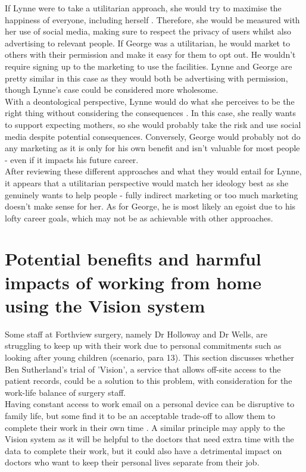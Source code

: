 \documentclass[12pt,a4paper]{article}
\begin{document}
If Lynne were to take a utilitarian approach, she would try to maximise the happiness of everyone, including herself \cite{Utilitarianism}. Therefore, she would be measured with her use of social media, making sure to respect the privacy of users whilst also advertising to relevant people. If George was a utilitarian, he would market to others with their permission and make it easy for them to opt out. He wouldn't require signing up to the marketing to use the facilities. Lynne and George are pretty similar in this case as they would both be advertising with permission, though Lynne's case could be considered more wholesome.\\

With a deontological perspective, Lynne would do what she perceives to be the right thing without considering the consequences \cite{Deontology}. In this case, she really wants to support expecting mothers, so she would probably take the risk and use social media despite potential consequences. Conversely, George would probably not do any marketing as it is only for his own benefit and isn't valuable for most people - even if it impacts his future career.\\

After reviewing these different approaches and what they would entail for Lynne, it appears that a utilitarian perspective would match her ideology best as she genuinely wants to help people - fully indirect marketing or too much marketing doesn't make sense for her. As for George, he is most likely an egoist due to his lofty career goals, which may not be as achievable with other approaches.

\section{Potential benefits and harmful impacts of working from home using the Vision system}

Some staff at Forthview surgery, namely Dr Holloway and Dr Wells, are struggling to keep up with their work due to personal commitments such as looking after young children (scenario, para 13). This section discusses whether Ben Sutherland's trial of 'Vision', a service that allows off-site access to the patient records, could be a solution to this problem, with consideration for the work-life balance of surgery staff.\\

Having constant access to work email on a personal device can be disruptive to family life, but some find it to be an acceptable trade-off to allow them to complete their work in their own time \cite{mobileoverload}. A similar principle may apply to the Vision system as it will be helpful to the doctors that need extra time with the data to complete their work, but it could also have a detrimental impact on doctors who want to keep their personal lives separate from their job.\\
\end{document}
